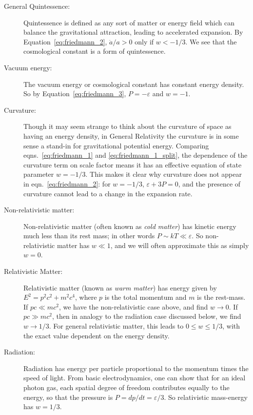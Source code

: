 \begin{description}
  \item[General Quintessence:] Quintessence is defined as any sort of matter
    or energy field
    which can balance the gravitational attraction, leading to accelerated
    expansion.  By Equation~\ref{eq:friedmann_2}, $\ddot{a}/a > 0$ only
    if $w < - 1/3$.  We see that the cosmological constant is a form of
    quintessence.
  \item[Vacuum energy:] The vacuum energy or cosmological constant has
    constant energy density.  So by Equation~\ref{eq:friedmann_3},
    $P = -\varepsilon$ and $w = -1$.
  \item[Curvature:] Though it may seem strange to think about the curvature
    of space as having an energy density, in General Relativity the curvature
    is in some sense a stand-in for gravitational potential energy.  Comparing
    eqns.~\ref{eq:friedmann_1} and \ref{eq:friedmann_1_split}, the dependence
    of the curvature term on scale factor means it has an effective equation
    of state parameter $w = -1/3$.  This makes it clear why curvature does
    not appear in eqn.~\ref{eq:friedmann_2}: for $w=-1/3$,
    $\varepsilon + 3P = 0$, and the presence of curvature cannot lead to
    a change in the expansion rate.
  \item[Non-relativistic matter:] Non-relativistic matter (often known
    as {\it cold matter}) has kinetic energy much less than its rest mass;
    in other words $P \sim kT \ll \varepsilon$.  So non-relativistic matter
    has $w \ll 1$, and we will often approximate this as simply $w=0$.
  \item[Relativistic Matter:] Relativistic matter 
    (known as {\it warm matter}) has energy given by
    $E^2 = p^2c^2 + m^2 c^4$, where $p$ is the total momentum and $m$ is
    the rest-mass.  If $pc \ll mc^2$, we have the non-relativistic
    case above, and find $w \to 0$.  If $pc \gg mc^2$, then in analogy to
    the radiation case discussed below, we find $w \to 1/3$.
    For general relativistic matter, this leads to
    $0 \le w \le 1/3$, with the exact value dependent on the energy density.
  \item[Radiation:] Radiation has energy per particle
    proportional to the momentum times the speed of light.  From basic
    electrodynamics, one can show that for an ideal photon gas, each spatial
    degree of freedom contributes equally to the energy, so that the pressure
    is $P = dp/dt = \varepsilon / 3$.  So relativistic mass-energy has
    $w = 1/3$.
\end{description}

